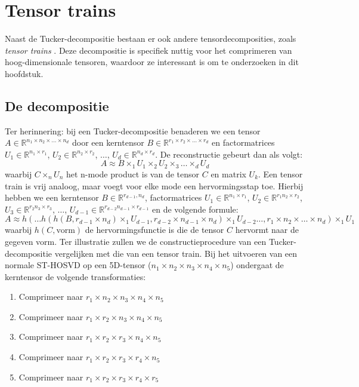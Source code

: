 \section{Tensor trains}

Naast de Tucker-decompositie bestaan er ook andere tensordecomposities, zoals \textit{tensor trains} \cite{ref:tensor_trains}. Deze decompositie is specifiek nuttig voor het comprimeren van hoog-dimensionale tensoren, waardoor ze interessant is om te onderzoeken in dit hoofdstuk.

\subsection{De decompositie}

Ter herinnering: bij een Tucker-decompositie benaderen we een tensor $A \in \mathbb{R}^{n_1 \times n_2 \times \dots \times n_d}$ door een kerntensor $B \in \mathbb{R}^{r_1 \times r_2 \times \dots \times r_d}$ en factormatrices $U_1 \in \mathbb{R}^{n_1 \times r_1}$, $U_2 \in \mathbb{R}^{n_2 \times r_2}$, $\dots$, $U_d \in \mathbb{R}^{n_d \times r_d}$. De reconstructie gebeurt dan als volgt:
\[
A \approx B \times_1 U_1 \times_2 U_2 \times_3 \dots \times_d U_d
\]
waarbij $C \times_n U_n$ het n-mode product is van de tensor $C$ en matrix $U_k$. Een tensor train is vrij analoog, maar voegt voor elke mode een hervormingsstap toe. Hierbij hebben we een kerntensor $B \in \mathbb{R}^{r_{d-1},n_d}$, factormatrices $U_1 \in \mathbb{R}^{n_1 \times r_1}$, $U_2 \in \mathbb{R}^{r_1 n_2 \times r_2}$, $U_3 \in \mathbb{R}^{r_2 n_3 \times r_3}$, $\dots$, $U_{d-1} \in \mathbb{R}^{r_{d-2} n_{d-1} \times r_{d-1}}$ en de volgende formule:
\[
A \approx h(\dots h(h(B, r_{d-1} \times n_d) \times_1 U_{d-1}, r_{d-2} \times n_{d-1} \times n_d) \times_1 U_{d-2} \dots, r_1 \times n_2 \times \dots \times n_d) \times_1 U_1
\]
waarbij $h(C, \text{vorm})$ de hervormingsfunctie is die de tensor $C$ hervormt naar de gegeven vorm. Ter illustratie zullen we de constructieprocedure van een Tucker-decompositie vergelijken met die van een tensor train. Bij het uitvoeren van een normale ST-HOSVD op een 5D-tensor ($n_1 \times n_2 \times n_3 \times n_4 \times n_5$) ondergaat de kerntensor de volgende transformaties:

\begin{enumerate}
\item Comprimeer naar $r_1 \times n_2 \times n_3 \times n_4 \times n_5$
\item Comprimeer naar $r_1 \times r_2 \times n_3 \times n_4 \times n_5$
\item Comprimeer naar $r_1 \times r_2 \times r_3 \times n_4 \times n_5$
\item Comprimeer naar $r_1 \times r_2 \times r_3 \times r_4 \times n_5$
\item Comprimeer naar $r_1 \times r_2 \times r_3 \times r_4 \times r_5$
\end{enumerate}

